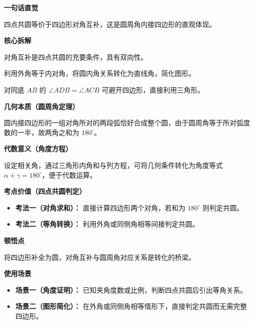 \begin{explanationbox}
	\textbf{\textcolor{CExplanation}{一句话直觉}}

	四点共圆等价于四边形对角互补，这是圆周角内接四边形的直观体现。

	\medskip
	\textbf{\textcolor{CExplanation}{核心拆解}}
	\begin{description}[style=nextline, leftmargin=2.8em, labelsep=0.5em, itemsep=0.45em]
		\item[\textbf{要点一（充要条件）：}] 对角互补是四点共圆的充要条件，具有双向性。
		\item[\textbf{要点二（外角转化）：}] 利用外角等于内对角，将圆内角关系转化为直线角，简化图形。
		\item[\textbf{要点三（同侧等角）：}] 对同底 $AB$ 的 $\angle ADB=\angle ACB$ 可避开四边形，直接利用三角形。
	\end{description}

	\medskip
	\textbf{\textcolor{CExplanation}{几何本质（圆周角定理）}}

	圆内接四边形的一组对角所对的两段弧恰好合成整个圆，由于圆周角等于所对弧度数的一半，故两角之和为 $180^\circ$。

	\medskip
	\textbf{\textcolor{CExplanation}{代数意义（角度方程）}}

	设定相关角，通过三角形内角和与列方程，可将几何条件转化为角度等式 $\alpha+\gamma=180^\circ$，便于代数运算。

	\medskip
	\textbf{\textcolor{CExplanation}{考点价值（四点共圆判定）}}
	\begin{itemize}[leftmargin=*, itemsep=0.5em, topsep=0.4em]
		\item \textbf{考法一（对角求和）：} 直接计算四边形两个对角，若和为 $180^\circ$ 则判定共圆。
		\item \textbf{考法二（等角转换）：} 利用外角或同侧角相等间接判定共圆。
	\end{itemize}

	\medskip
	\textbf{\textcolor{CExplanation}{顿悟点}}

	将四边形补全为圆，对角互补与圆周角对应关系是转化的桥梁。

	\medskip
	\textbf{\textcolor{CExplanation}{使用场景}}
	\begin{itemize}[leftmargin=*, itemsep=0.5em, topsep=0.4em]
		\item \textbf{场景一（角度证明）：} 已知夹角度数或比例，判断四点共圆后引出等角关系。
		\item \textbf{场景二（图形简化）：} 在外角或同侧角相等情形下，直接判定共圆而无需完整四边形。
	\end{itemize}
\end{explanationbox}
